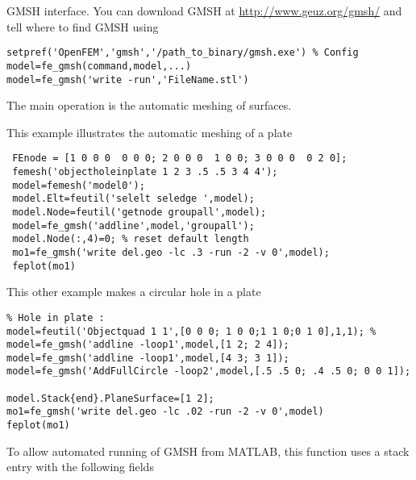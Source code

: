 

GMSH interface. You can download GMSH at \url{http://www.geuz.org/gmsh/} and tell where to find GMSH using

\rsyntax\begin{verbatim}
setpref('OpenFEM','gmsh','/path_to_binary/gmsh.exe') % Config
model=fe_gmsh(command,model,...)
model=fe_gmsh('write -run','FileName.stl')
\end{verbatim}


The main operation is the automatic meshing of surfaces.



This example illustrates the automatic meshing of a plate
\begin{verbatim}
 FEnode = [1 0 0 0  0 0 0; 2 0 0 0  1 0 0; 3 0 0 0  0 2 0];
 femesh('objectholeinplate 1 2 3 .5 .5 3 4 4');
 model=femesh('model0');
 model.Elt=feutil('selelt seledge ',model);
 model.Node=feutil('getnode groupall',model);
 model=fe_gmsh('addline',model,'groupall');
 model.Node(:,4)=0; % reset default length
 mo1=fe_gmsh('write del.geo -lc .3 -run -2 -v 0',model);
 feplot(mo1)
\end{verbatim}%



This other example makes a circular hole in a plate 
\begin{verbatim}
% Hole in plate :
model=feutil('Objectquad 1 1',[0 0 0; 1 0 0;1 1 0;0 1 0],1,1); %
model=fe_gmsh('addline -loop1',model,[1 2; 2 4]);
model=fe_gmsh('addline -loop1',model,[4 3; 3 1]);
model=fe_gmsh('AddFullCircle -loop2',model,[.5 .5 0; .4 .5 0; 0 0 1]);
 
model.Stack{end}.PlaneSurface=[1 2]; 
mo1=fe_gmsh('write del.geo -lc .02 -run -2 -v 0',model)
feplot(mo1)
\end{verbatim}%


To allow automated running of GMSH from MATLAB, this function uses a  stack entry with the following fields

